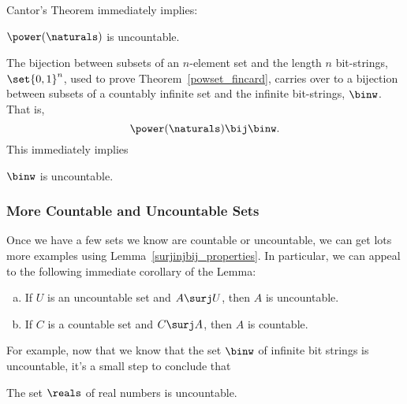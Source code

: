 Cantor's Theorem immediately implies:

\begin{corollary}
$\power(\naturals)$ is uncountable.
\end{corollary}

The bijection between subsets of an $n$-element set and the length $n$
bit-strings, $\set{0,1}^n$, used to prove
Theorem~\ref{powset_fincard}, carries over to a bijection between
subsets of a countably infinite set and the infinite bit-strings,
$\binw$.  That is,
\[
\power(\naturals) \bij \binw.
\]
This immediately implies
\begin{corollary}
$\binw$ is uncountable.
\end{corollary}

\subsubsection{More Countable and Uncountable Sets}

Once we have a few sets we know are countable or uncountable, we can
get lots more examples using Lemma~\ref{surjinjbij_properties}.  In particular, 
we can appeal to the following immediate corollary of the Lemma:
\noindent \begin{corollary}\label{UinjAu}
\mbox{}
\begin{enumerate}[(a)]

\item\label{AsurjUA}
If $U$ is an uncountable set and $A \surj U$, then $A$ is uncountable.

\item\label{CsurjAc}
If $C$ is a countable set and $C \surj A$, then $A$ is countable.
\end{enumerate}
\end{corollary}

For example, now that we know that the set $\binw$ of infinite bit
strings is uncountable, it's a small step to conclude that
\begin{corollary}\label{uncountR}
The set $\reals$ of real numbers is uncountable.
\end{corollary}

